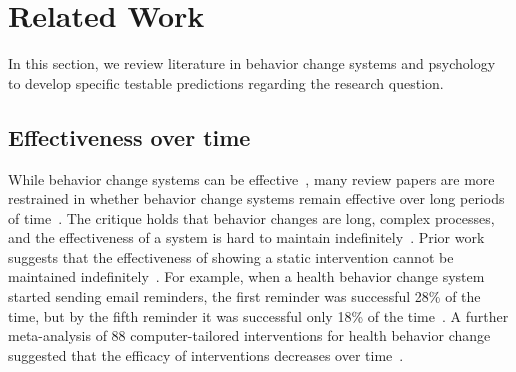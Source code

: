 \section{Related Work}


In this section, we review literature in behavior change systems and psychology to develop specific testable predictions regarding the research question.%

\subsection{Effectiveness over time}
While behavior change systems can be effective~\cite{doi:10.1080/15228830802094429, Cuijpers2008, info:doi/10.2196/jmir.1376}, many review papers are more restrained in whether behavior change systems remain effective over long periods of time~\cite{doi:10.1111/j.1467-789X.2009.00646.x, 10.1371/journal.pmed.1000387, NORMAN2007336, 10.1007/978-3-319-07127-5_11}. The critique holds that behavior changes are long, complex processes, and the effectiveness of a system is hard to maintain indefinitely~\cite{prochaska1997transtheoretical}. Prior work suggests that the effectiveness of showing a static intervention cannot be maintained indefinitely~\cite{Hiniker:2016:MDE:2858036.2858403, riekert2013handbook}. For example, when a health behavior change system started sending email reminders, the first reminder was successful 28\% of the time, but by the fifth reminder it was successful only 18\% of the time~\cite{kaptein2015personalizing}. A further meta-analysis of 88 computer-tailored interventions for health behavior change suggested that the efficacy of interventions decreases over time~\cite{krebs2010meta}. %

